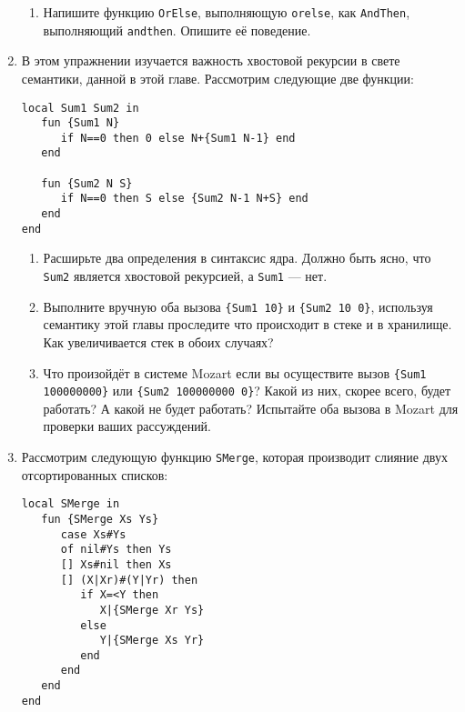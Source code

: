 \begin{enumerate}
{\begin{enumerate}
{будет ли равен результат вышеприведённого выражения результату \lstinline!$\langle$expression$\rangle_1$ andthen $\langle$expression$\rangle_2$!? Будет ли в той же ситуации вычисляться \lstinline!$\langle$expression$\rangle_2$! или нет?}

\item{Напишите функцию \lstinline!OrElse!, выполняющую \lstinline!orelse!, как \lstinline!AndThen!, выполняющий \lstinline!andthen!. Опишите её поведение.}
  \end{enumerate}
}

\item{В этом упражнении изучается важность хвостовой рекурсии в свете семантики, данной в этой главе. Рассмотрим следующие две функции:

  \begin{lstlisting}
local Sum1 Sum2 in
   fun {Sum1 N}
      if N==0 then 0 else N+{Sum1 N-1} end
   end

   fun {Sum2 N S}
      if N==0 then S else {Sum2 N-1 N+S} end
   end
end
  \end{lstlisting}

  \begin{enumerate}
\item{Расширьте два определения в синтаксис ядра. Должно быть ясно, что \lstinline!Sum2! является хвостовой рекурсией, а \lstinline!Sum1! --- нет.}

\item{Выполните вручную оба вызова \lstinline!{Sum1 10}! и \lstinline!{Sum2 10 0}!, используя семантику этой главы проследите что происходит в стеке и в хранилище. Как увеличивается стек в обоих случаях?}

\item{Что произойдёт в системе Mozart если вы осуществите вызов \lstinline!{Sum1 100000000}! или \lstinline!{Sum2 100000000 0}!? Какой из них, скорее всего, будет работать? А какой не будет работать? Испытайте оба вызова в Mozart для проверки ваших рассуждений.}
  \end{enumerate}
}

\item{Рассмотрим следующую функцию \lstinline!SMerge!, которая производит слияние двух отсортированных списков:

  \begin{lstlisting}
local SMerge in
   fun {SMerge Xs Ys}
      case Xs#Ys
      of nil#Ys then Ys
      [] Xs#nil then Xs
      [] (X|Xr)#(Y|Yr) then
         if X=<Y then
            X|{SMerge Xr Ys}
         else
            Y|{SMerge Xs Yr}
         end
      end
   end
end
  \end{lstlisting}
  
}
\end{enumerate}
